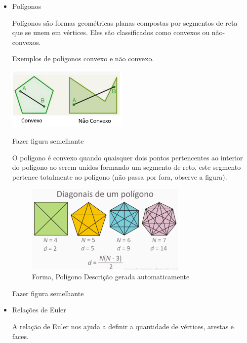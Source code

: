 \begin{escolha}
{{{\begin{escolha}
{{{{\begin{itemize}
Montar nova figura

O plano cartesiano tem os pontos indicado par ordenado (a, b). O valor
\textbf{a} é a abscissa e \textbf{b} é a ordenada. Por exemplo, o ponto
A é (2, \num{3}.

  \item Polígonos

Polígonos são formas geométricas planas compostas por segmentos de reta
que se unem em vértices. Eles são classificados como convexos ou
não-convexos.

Exemplos de polígonos convexo e não convexo.

\includegraphics[width=2.32292in,height=1.19387in]{./_SAEB_9_MAT/media/image160.png}

Fazer figura semelhante

O polígono é convexo quando quaisquer dois pontos pertencentes ao
interior do polígono ao serem unidos formando um segmento de reto, este
segmento pertence totalmente ao polígono (não passa por fora, observe a
figura).

\begin{figure}
\centering
\includegraphics[width=3.07204in,height=1.70833in]{./_SAEB_9_MAT/media/image161.png}
\caption{Forma, Polígono Descrição gerada automaticamente}
\end{figure}

Fazer figura semelhante

  \item Relações de Euler

A relação de Euler nos ajuda a definir a quantidade de vértices, arestas
e faces.


\end{itemize}}}}}
\end{escolha}}}}
\end{escolha}
